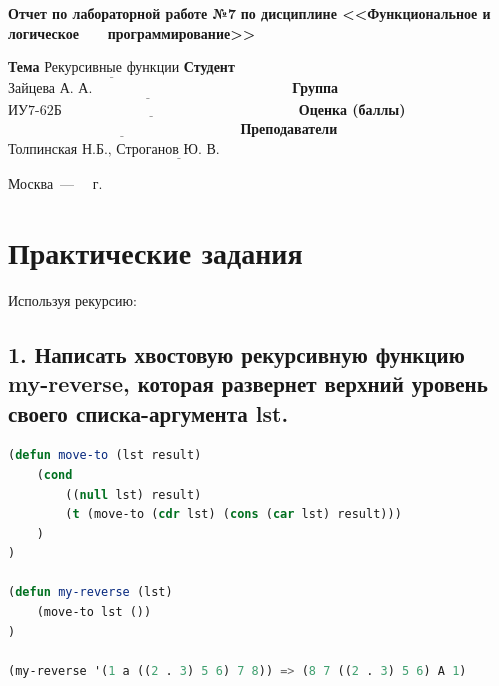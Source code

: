 \documentclass[12pt]{report}
\begin{document}
\begin{titlepage}
		\begin{center}
			\noindent\begin{minipage}{1.1\textwidth}\centering
				\Large\textbf{  Отчет по лабораторной работе №7}\newline
				\textbf{по дисциплине <<Функциональное и логическое}\newline
				\textbf{~~~программирование>>}\newline\newline
			\end{minipage}
		\end{center}
		
		\noindent\textbf{Тема} $\underline{\text{Рекурсивные функции}}$\newline\newline
		\noindent\textbf{Студент} $\underline{\text{Зайцева А. А.~~~~~~~~~~~~~~~~~~~~~~~~~~~~~~~~~~~~~~~~~~}}$\newline\newline
		\noindent\textbf{Группа} $\underline{\text{ИУ7-62Б~~~~~~~~~~~~~~~~~~~~~~~~~~~~~~~~~~~~~~~~~~~~~~~~~~}}$\newline\newline
		\noindent\textbf{Оценка (баллы)} $\underline{\text{~~~~~~~~~~~~~~~~~~~~~~~~~~~~~~~~~~~~~~~~~~~~~~~~~}}$\newline\newline
		\noindent\textbf{Преподаватели} $\underline{\text{Толпинская Н.Б., Строганов Ю. В.~~~~~~~~~~~~~~~~~~~~~~~~~~~~}}$\newline\newline\newline
		
		\begin{center}
			\vfill
			Москва~---~\the\year
			~г.
		\end{center}
	\end{titlepage}


\chapter*{Практические задания}	

Используя рекурсию:


\section*{1. Написать хвостовую рекурсивную функцию my-reverse, которая развернет верхний уровень своего списка-аргумента lst.}

\begin{lstlisting}[language=Lisp]
(defun move-to (lst result)
	(cond 
		((null lst) result)
		(t (move-to (cdr lst) (cons (car lst) result)))
	)
)

(defun my-reverse (lst)
	(move-to lst ())
)

(my-reverse '(1 a ((2 . 3) 5 6) 7 8)) => (8 7 ((2 . 3) 5 6) A 1)
\end{lstlisting}
\end{document}
